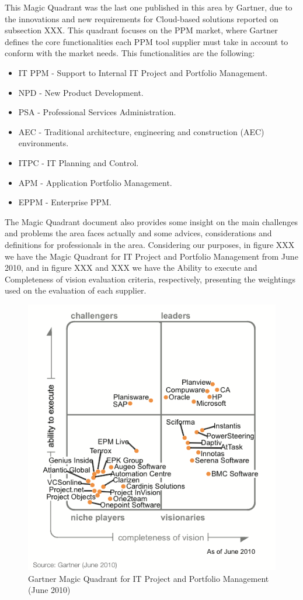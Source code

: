 This Magic Quadrant was the last one published in this area by Gartner, due to the innovations and new requirements for Cloud-based solutions reported on subsection XXX.
This quadrant focuses on the PPM market, where Gartner defines the core functionalities each PPM tool supplier must take in account to conform with the market needs. This functionalities are the following:

\begin{itemize}
\item IT PPM - Support to Internal IT Project and Portfolio Management.
\item NPD - New Product Development.
\item PSA - Professional Services Administration.
\item AEC - Traditional architecture, engineering and construction (AEC) environments.
\item ITPC - IT Planning and Control.
\item APM - Application Portfolio Management.
\item EPPM - Enterprise PPM.
\end{itemize}

The Magic Quadrant document also provides some insight on the main challenges and problems the area faces actually and some advices, considerations and definitions for professionals in the area. Considering our purposes, in figure XXX we have the Magic Quadrant for IT Project and Portfolio Management from June 2010, and in figure XXX and XXX we have the Ability to execute and Completeness of vision evaluation criteria, respectively, presenting the weightings used on the evaluation of each supplier.\par

\begin{figure}
\centering
\includegraphics{img/MQPPMTools.png}
\caption{Gartner Magic Quadrant for IT Project and Portfolio Management (June 2010)}
\end{figure}

